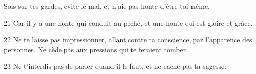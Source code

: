 Sois sur tes gardes, évite le mal, et n’aie pas honte d’être toi-même.

21 Car il y a une honte qui conduit au péché, et une honte qui est gloire et grâce.

22 Ne te laisse pas impressionner, allant contre ta conscience, par l’apparence des personnes. Ne cède pas aux pressions qui te feraient tomber.

23 Ne t’interdis pas de parler quand il le faut, et ne cache pas ta sagesse.
